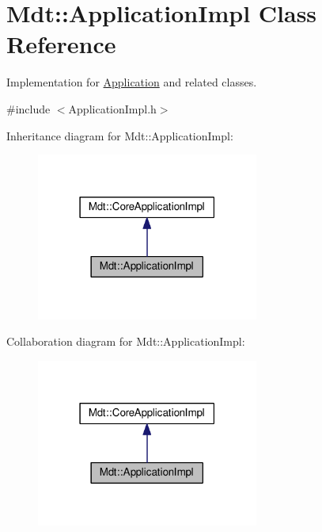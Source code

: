 \hypertarget{class_mdt_1_1_application_impl}{}\section{Mdt\+:\+:Application\+Impl Class Reference}
\label{class_mdt_1_1_application_impl}


Implementation for \hyperlink{class_mdt_1_1_application}{Application} and related classes.  




{\ttfamily \#include $<$Application\+Impl.\+h$>$}



Inheritance diagram for Mdt\+:\+:Application\+Impl\+:
\nopagebreak
\begin{figure}[H]
\begin{center}
\leavevmode
\includegraphics[width=207pt]{class_mdt_1_1_application_impl__inherit__graph}
\end{center}
\end{figure}


Collaboration diagram for Mdt\+:\+:Application\+Impl\+:
\nopagebreak
\begin{figure}[H]
\begin{center}
\leavevmode
\includegraphics[width=207pt]{class_mdt_1_1_application_impl__coll__graph}
\end{center}
\end{figure}
